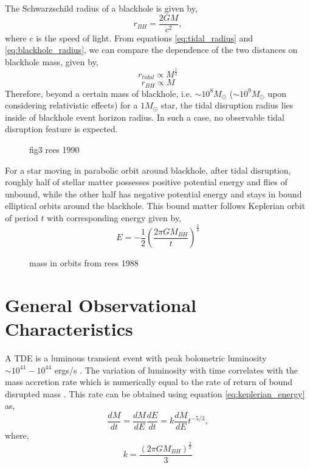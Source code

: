 \documentclass{tda}
\begin{document}
\noindent The Schwarzschild radius of a blackhole is given by,
\begin{equation}
	r_{BH} = \frac{2GM}{c^2},
	\label{eq:blackhole_radius}
\end{equation}
where \(c\) is the speed of light. From equations \ref{eq:tidal_radius} and \ref{eq:blackhole_radius}, we can compare the dependence of the two distances on blackhole mass, given by,
\begin{equation}
	r_{tidal} \propto M^\frac{1}{3}
	\label{eq:tidal_radius_proportionality}
\end{equation}
\begin{equation}
	r_{BH} \propto M
	\label{eq:blackhole_radius_proportionality}
\end{equation}
Therefore, beyond a certain mass of blackhole, i.e. \(\sim10^8 M_{\odot}\) (\(\sim10^9 M_{\odot}\) upon considering relativistic effects) for a \(1 M_{\odot}\) star, the tidal disruption radius lies inside of blackhole event horizon radius. In such a case, no observable tidal disruption feature is expected.

\begin{figure} [h]
	\caption{fig3 rees 1990}
\end{figure}

For a star moving in parabolic orbit around blackhole, after tidal disruption, roughly half of stellar matter possesses positive potential energy and flies of unbound, while the other half has negative potential energy and stays in bound elliptical orbits around the blackhole. This bound matter follows Keplerian orbit of period \(t\) with corresponding energy given by,
\begin{equation}
	E = -\frac{1}{2} \left( \frac{2 \pi G M_{BH}}{t} \right)^\frac{2}{3}
	\label{eq:keplerian_energy}
\end{equation}

\begin{figure}
	\caption{mass in orbits from rees 1988}
\end{figure}


\section{General Observational Characteristics}

A TDE is a luminous transient event with peak bolometric luminosity \(\sim 10^{41} - 10^{44}\) ergs/s \cite{lodato_multiband_2011, bonnerot_simulating_2020}. The variation of luminosity with time correlates with the mass accretion rate which is numerically equal to the rate of return of bound disrupted mass \cite{phinney_manifestations_1989}. This rate can be obtained using equation \ref{eq:keplerian_energy} as,
\begin{equation}
	\frac{dM}{dt} = \frac{dM}{dE} \frac{dE}{dt} = k \frac{dM}{dE} t^{-5/3},
	\label{eq:tde_luminosity_time}
\end{equation}
where, \[k=\frac{\left({2 \pi G M_{BH}}\right)^{\frac{2}{3}}}{3}\]
\end{document}
